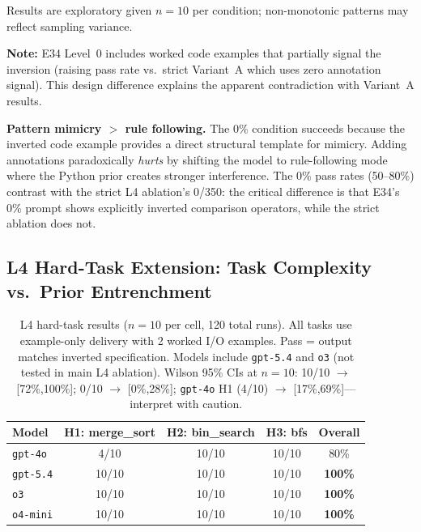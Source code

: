 Results are exploratory given $n{=}10$ per condition; non-monotonic patterns may reflect sampling variance.

\textbf{Note:} E34 Level~0 includes worked code examples that partially signal the inversion (raising pass rate vs.\ strict Variant~A which uses zero annotation signal). This design difference explains the apparent contradiction with Variant~A results.

\textbf{Pattern mimicry $>$ rule following.} The 0\% condition succeeds because the inverted code example provides a direct structural template for mimicry. Adding annotations paradoxically \emph{hurts} by shifting the model to rule-following mode where the Python prior creates stronger interference. The 0\% pass rates (50--80\%) contrast with the strict L4 ablation's 0/350: the critical difference is that E34's 0\% prompt shows explicitly inverted comparison operators, while the strict ablation does not.

\subsection{L4 Hard-Task Extension: Task Complexity vs.\ Prior Entrenchment}
\label{sec:l4_hard}

\begin{table}[!t]
\centering
\caption{L4 hard-task results ($n=10$ per cell, 120 total runs). All tasks use example-only delivery with 2 worked I/O examples. Pass = output matches inverted specification. Models include \texttt{gpt-5.4} and \texttt{o3} (not tested in main L4 ablation). Wilson 95\% CIs at $n=10$: 10/10 $\to$ [72\%,100\%]; 0/10 $\to$ [0\%,28\%]; \texttt{gpt-4o} H1 (4/10) $\to$ [17\%,69\%]---interpret with caution.}
\label{tab:l4_hard}
\footnotesize
\begin{tabular}{@{}lcccc@{}}
\toprule
\textbf{Model} & \textbf{H1: merge\_sort} & \textbf{H2: bin\_search} & \textbf{H3: bfs} & \textbf{Overall} \\
\midrule
\texttt{gpt-4o}   & \cellcolor{yellow!20}4/10  & \cellcolor{green!15}10/10 & \cellcolor{green!15}10/10 & 80\% \\
\texttt{gpt-5.4}  & \cellcolor{green!15}10/10 & \cellcolor{green!15}10/10 & \cellcolor{green!15}10/10 & \textbf{100\%} \\
\texttt{o3}       & \cellcolor{green!15}10/10 & \cellcolor{green!15}10/10 & \cellcolor{green!15}10/10 & \textbf{100\%} \\
\texttt{o4-mini}  & \cellcolor{green!15}10/10 & \cellcolor{green!15}10/10 & \cellcolor{green!15}10/10 & \textbf{100\%} \\
\bottomrule
\end{tabular}
\end{table}


